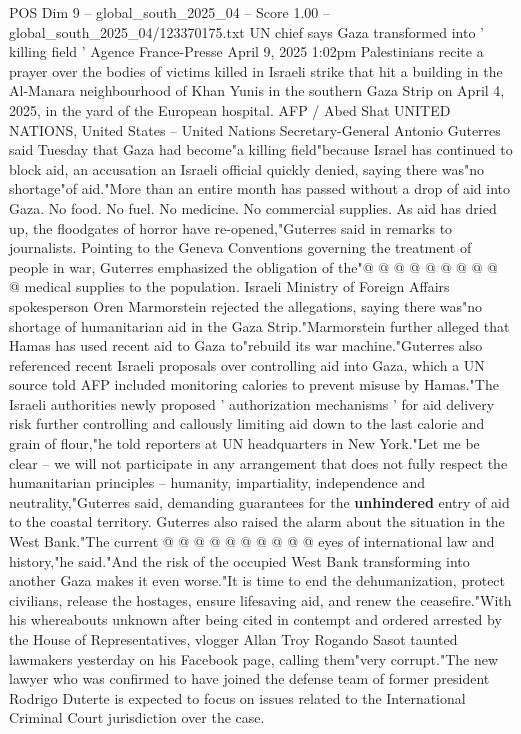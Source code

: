 \begin{textsample}{POS Dim 9 – global\_south\_2025\_04 – Score 1.00 – global\_south\_2025\_04/123370175.txt}  \label{ex:f9_pos_188}
UN chief says Gaza transformed into ' killing field ' Agence France-Presse April 9, 2025 1:02pm Palestinians recite a prayer over the bodies of victims killed in Israeli strike that hit a building in the Al-Manara neighbourhood of Khan Yunis in the southern Gaza Strip on April 4, 2025, in the yard of the European hospital.
AFP / Abed Shat UNITED NATIONS, United States -- United Nations Secretary-General Antonio Guterres said Tuesday that Gaza had become"a killing field"because Israel has continued to block aid, an accusation an Israeli official quickly denied, saying there was"no shortage"of aid."More than an entire month has passed without a drop of aid into Gaza.
No food.
No fuel.
No medicine.
No commercial supplies.
As aid has dried up, the floodgates of horror have re-opened,"Guterres said in remarks to journalists.
Pointing to the Geneva Conventions governing the treatment of people in war, Guterres emphasized the obligation of the"@ @ @ @ @ @ @ @ @ @ medical supplies to the population.
Israeli Ministry of Foreign Affairs spokesperson Oren Marmorstein rejected the allegations, saying there was"no shortage of humanitarian aid in the Gaza Strip."Marmorstein further alleged that Hamas has used recent aid to Gaza to"rebuild its war machine."Guterres also referenced recent Israeli proposals over controlling aid into Gaza, which a UN source told AFP included monitoring calories to prevent misuse by Hamas."The Israeli authorities newly proposed ' authorization mechanisms ' for aid delivery risk further controlling and callously limiting aid down to the last calorie and grain of flour,"he told reporters at UN headquarters in New York."Let me be clear -- we will not participate in any arrangement that does not fully respect the humanitarian principles -- humanity, impartiality, independence and neutrality,"Guterres said, demanding guarantees for the \textbf{unhindered} entry of aid to the coastal territory.
Guterres also raised the alarm about the situation in the West Bank."The current @ @ @ @ @ @ @ @ @ @ eyes of international law and history,"he said."And the risk of the occupied West Bank transforming into another Gaza makes it even worse."It is time to end the dehumanization, protect civilians, release the hostages, ensure lifesaving aid, and renew the ceasefire."With his whereabouts unknown after being cited in contempt and ordered arrested by the House of Representatives, vlogger Allan Troy Rogando Sasot taunted lawmakers yesterday on his Facebook page, calling them"very corrupt."The new lawyer who was confirmed to have joined the defense team of former president Rodrigo Duterte is expected to focus on issues related to the International Criminal Court jurisdiction over the case.

\end{textsample}
